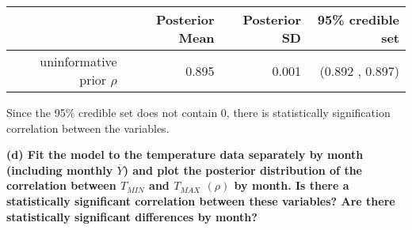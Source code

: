 \documentclass[
]{article}
\begin{document}
\begin{longtable}[]{@{}rrrr@{}}
\toprule
& Posterior Mean & Posterior SD & 95\% credible set\tabularnewline
\midrule
\endhead
uninformative prior \(\rho\) & 0.895 & 0.001 & (0.892 ,
0.897)\tabularnewline
\bottomrule
\end{longtable}

Since the 95\% credible set does not contain 0, there is statistically
signification correlation between the variables.

\textbf{(d) Fit the model to the temperature data separately by month
(including monthly \(\overline{Y }\)) and plot the posterior
distribution of the correlation between \(T_{MIN}\) and \(T_{MAX}\)
\((\rho)\) by month. Is there a statistically significant correlation
between these variables? Are there statistically significant differences
by month?}
\end{document}
